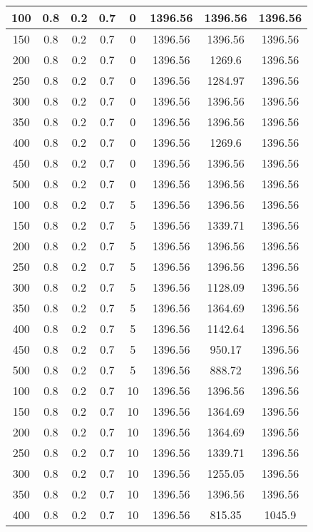 \documentclass[a4paper, 12pt]{extreport}
\begin{document}
\begin{itemize}
\begin{longtable}{|c|c|c|c|c|c|c|c|}
			100 & 0.8 & 0.2 & 0.7 & 0 & 1396.56 & 1396.56 & 1396.56 \\\hline
			150 & 0.8 & 0.2 & 0.7 & 0 & 1396.56 & 1396.56 & 1396.56 \\\hline
			200 & 0.8 & 0.2 & 0.7 & 0 & 1396.56 & 1269.6 & 1396.56 \\\hline
			250 & 0.8 & 0.2 & 0.7 & 0 & 1396.56 & 1284.97 & 1396.56 \\\hline
			300 & 0.8 & 0.2 & 0.7 & 0 & 1396.56 & 1396.56 & 1396.56 \\\hline
			350 & 0.8 & 0.2 & 0.7 & 0 & 1396.56 & 1396.56 & 1396.56 \\\hline
			400 & 0.8 & 0.2 & 0.7 & 0 & 1396.56 & 1269.6 & 1396.56 \\\hline
			450 & 0.8 & 0.2 & 0.7 & 0 & 1396.56 & 1396.56 & 1396.56 \\\hline
			500 & 0.8 & 0.2 & 0.7 & 0 & 1396.56 & 1396.56 & 1396.56 \\\hline
			100 & 0.8 & 0.2 & 0.7 & 5 & 1396.56 & 1396.56 & 1396.56 \\\hline
			150 & 0.8 & 0.2 & 0.7 & 5 & 1396.56 & 1339.71 & 1396.56 \\\hline
			200 & 0.8 & 0.2 & 0.7 & 5 & 1396.56 & 1396.56 & 1396.56 \\\hline
			250 & 0.8 & 0.2 & 0.7 & 5 & 1396.56 & 1396.56 & 1396.56 \\\hline
			300 & 0.8 & 0.2 & 0.7 & 5 & 1396.56 & 1128.09 & 1396.56 \\\hline
			350 & 0.8 & 0.2 & 0.7 & 5 & 1396.56 & 1364.69 & 1396.56 \\\hline
			400 & 0.8 & 0.2 & 0.7 & 5 & 1396.56 & 1142.64 & 1396.56 \\\hline
			450 & 0.8 & 0.2 & 0.7 & 5 & 1396.56 & 950.17 & 1396.56 \\\hline
			500 & 0.8 & 0.2 & 0.7 & 5 & 1396.56 & 888.72 & 1396.56 \\\hline
			100 & 0.8 & 0.2 & 0.7 & 10 & 1396.56 & 1396.56 & 1396.56 \\\hline
			150 & 0.8 & 0.2 & 0.7 & 10 & 1396.56 & 1364.69 & 1396.56 \\\hline
			200 & 0.8 & 0.2 & 0.7 & 10 & 1396.56 & 1364.69 & 1396.56 \\\hline
			250 & 0.8 & 0.2 & 0.7 & 10 & 1396.56 & 1339.71 & 1396.56 \\\hline
			300 & 0.8 & 0.2 & 0.7 & 10 & 1396.56 & 1255.05 & 1396.56 \\\hline
			350 & 0.8 & 0.2 & 0.7 & 10 & 1396.56 & 1396.56 & 1396.56 \\\hline
			400 & 0.8 & 0.2 & 0.7 & 10 & 1396.56 & 815.35 & 1045.9 \\\hline

\end{longtable}
\end{itemize}
\end{document}
